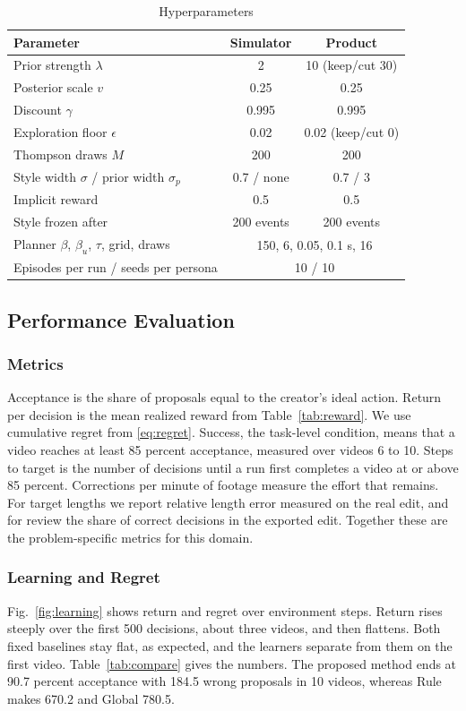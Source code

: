 \documentclass{ieeeaccess}
\begin{document}
\begin{table}[t]
\caption{Hyperparameters}
\label{tab:hyper}
\setlength{\tabcolsep}{3pt}
\centering
\begin{tabular}{|p{42mm}|c|c|}
\hline
Parameter & Simulator & Product \\
\hline
Prior strength $\lambda$ & 2 & 10 (keep/cut 30) \\
Posterior scale $v$ & 0.25 & 0.25 \\
Discount $\gamma$ & 0.995 & 0.995 \\
Exploration floor $\epsilon$ & 0.02 & 0.02 (keep/cut 0) \\
Thompson draws $M$ & 200 & 200 \\
Style width $\sigma$ / prior width $\sigma_p$ & 0.7 / none & 0.7 / 3 \\
Implicit reward & 0.5 & 0.5 \\
Style frozen after & 200 events & 200 events \\
Planner $\beta$, $\beta_u$, $\tau$, grid, draws & \multicolumn{2}{c|}{150, 6, 0.05, 0.1 s, 16} \\
Episodes per run / seeds per persona & \multicolumn{2}{c|}{10 / 10} \\
\hline
\end{tabular}
\end{table}

\subsection{Performance Evaluation}

\subsubsection{Metrics}
Acceptance is the share of proposals equal to the creator's ideal action. Return per decision is the mean realized reward from Table~\ref{tab:reward}. We use cumulative regret from \eqref{eq:regret}. Success, the task-level condition, means that a video reaches at least 85 percent acceptance, measured over videos 6 to 10. Steps to target is the number of decisions until a run first completes a video at or above 85 percent. Corrections per minute of footage measure the effort that remains. For target lengths we report relative length error measured on the real edit, and for review the share of correct decisions in the exported edit. Together these are the problem-specific metrics for this domain.

\subsubsection{Learning and Regret}
Fig.~\ref{fig:learning} shows return and regret over environment steps. Return rises steeply over the first 500 decisions, about three videos, and then flattens. Both fixed baselines stay flat, as expected, and the learners separate from them on the first video. Table~\ref{tab:compare} gives the numbers. The proposed method ends at 90.7 percent acceptance with 184.5 wrong proposals in 10 videos, whereas Rule makes 670.2 and Global 780.5.
\end{document}
